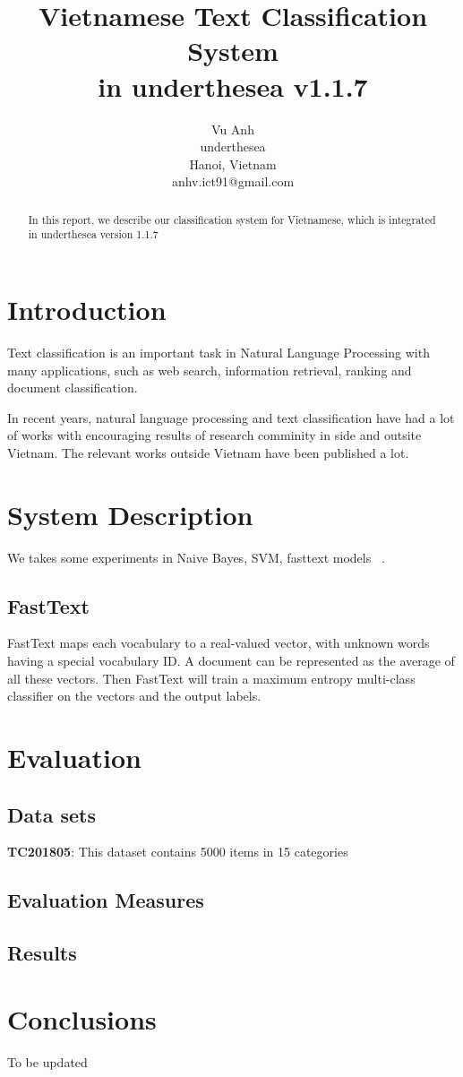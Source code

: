 \documentclass[11pt,a4paper]{article}
\title{Vietnamese Text Classification System \\ in underthesea v1.1.7}
\author{
Vu Anh\\
underthesea\\
Hanoi, Vietnam\\
anhv.ict91@gmail.com
}
\date{}
\begin{document}
\maketitle
\begin{abstract}
In this report, we describe our classification system for Vietnamese, which is integrated in underthesea version 1.1.7

\end{abstract}

\section{Introduction}

Text classification is an important task in Natural Language Processing with many applications, such as web search, information retrieval, ranking and document classification.

In recent years, natural language processing and text classification have had a lot of works with encouraging results of research comminity in side and outsite Vietnam. The relevant works outside Vietnam have been published a lot.

\section{System Description}

We takes some experiments in Naive Bayes, SVM, fasttext models ~\cite{DBLP:journals/corr/JoulinGBM16}.

\subsection{FastText}

FastText maps each vocabulary to a real-valued  vector, with unknown words having a special vocabulary ID. A document can be represented as the average of all these vectors. Then FastText will train a maximum entropy multi-class classifier  on the vectors and the output labels.

\section{Evaluation}

\subsection{Data sets}

\noindent \textbf{TC201805}: This dataset contains 5000 items in 15 categories

\subsection{Evaluation Measures}

\subsection{Results}


\section{Conclusions}

To be updated



\end{document}

